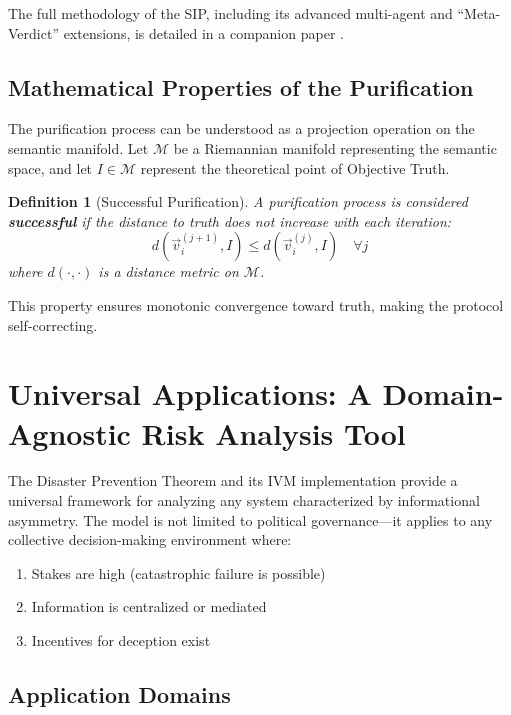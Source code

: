 \documentclass[11pt,a4paper]{article}
\newtheorem{definition}{Definition}[section]
\begin{document}
\begin{small}
The full methodology of the SIP, including its advanced multi-agent and ``Meta-Verdict'' extensions, is detailed in a companion paper \citep{Kovnatsky2025SIP}.

\subsection{Mathematical Properties of the Purification}

The purification process can be understood as a projection operation on the semantic manifold. Let $\mathcal{M}$ be a Riemannian manifold representing the semantic space, and let $I \in \mathcal{M}$ represent the theoretical point of Objective Truth.

\begin{definition}[Successful Purification]
A purification process is considered \textbf{successful} if the distance to truth does not increase with each iteration:
\begin{equation}
d(\vec{v}_i^{(j+1)}, I) \leq d(\vec{v}_i^{(j)}, I) \quad \forall j
\end{equation}
where $d(\cdot, \cdot)$ is a distance metric on $\mathcal{M}$.
\end{definition}

This property ensures monotonic convergence toward truth, making the protocol self-correcting.

\section{Universal Applications: A Domain-Agnostic Risk Analysis Tool}

The Disaster Prevention Theorem and its IVM implementation provide a universal framework for analyzing any system characterized by informational asymmetry. The model is not limited to political governance---it applies to any collective decision-making environment where:
\begin{enumerate}
    \item Stakes are high (catastrophic failure is possible)
    \item Information is centralized or mediated
    \item Incentives for deception exist
\end{enumerate}

\subsection{Application Domains}


\end{small}
\end{document}
